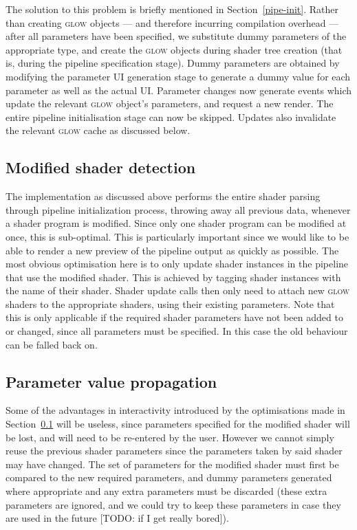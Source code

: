 \documentclass[12pt,twoside,notitlepage]{report}
\begin{document}
The solution to this problem is briefly mentioned in Section~\ref{pipe-init}. Rather than creating \textsc{glow} objects --- and therefore incurring compilation overhead --- after all parameters have been specified, we substitute dummy parameters of the appropriate type, and create the \textsc{glow} objects during shader tree creation (that is, during the pipeline specification stage). Dummy parameters are obtained by modifying the parameter UI generation stage to generate a dummy value for each parameter as well as the actual UI. Parameter changes now generate events which update the relevant \textsc{glow} object's parameters, and request a new render. The entire pipeline initialisation stage can now be skipped. Updates also invalidate the relevant \textsc{glow} cache as discussed below.

\subsection{Modified shader detection}
\label{msd}
The implementation as discussed above performs the entire shader parsing through pipeline initialization process, throwing away all previous data, whenever a shader program is modified. Since only one shader program can be modified at once, this is sub-optimal. This is particularly important since we would like to be able to render a new preview of the pipeline output as quickly as possible. The most obvious optimisation here is to only update shader instances in the pipeline that use the modified shader. This is achieved by tagging shader instances with the name of their shader. Shader update calls then only need to attach new \textsc{glow} shaders to the appropriate shaders, using their existing parameters. Note that this is only applicable if the required shader parameters have not been added to or changed, since all parameters must be specified. In this case the old behaviour can be falled back on.

\subsection{Parameter value propagation}
Some of the advantages in interactivity introduced by the optimisations made in Section~\ref{msd} will be useless, since parameters specified for the modified shader will be lost, and will need to be re-entered by the user. However we cannot simply reuse the previous shader parameters since the parameters taken by said shader may have changed. The set of parameters for the modified shader must first be compared to the new required parameters, and dummy parameters generated where appropriate and any extra parameters must be discarded (these extra parameters are ignored, and we could try to keep these parameters in case they are used in the future [TODO: if I get really bored]). 
\end{document}
